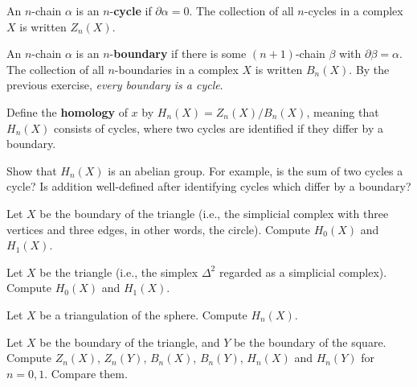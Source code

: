 \documentclass[12pt]{pset}
\begin{document}
\begin{definition*}
 An $n$-chain $\alpha$ is an $n$-\textbf{cycle} if $\partial \alpha =
 0$.  The collection of all $n$-cycles in a complex $X$ is written $Z_n(X)$.

 An $n$-chain $\alpha$ is an $n$-\textbf{boundary} if there is some
 $(n+1)$-chain $\beta$ with $\partial \beta = \alpha$.  The collection
 of all $n$-boundaries in a complex $X$ is written $B_n(X)$.  By the
 previous exercise, \textit{every boundary is a cycle}.
 
 Define the \textbf{homology} of $x$ by $H_n(X) = Z_n(X)/B_n(X)$,
 meaning that $H_n(X)$ consists of cycles, where two cycles are
 identified if they differ by a boundary.
\end{definition*}

\begin{requiredproblem}
  Show that $H_n(X)$ is an abelian group.  For example, is the sum of
  two cycles a cycle?  Is addition well-defined after identifying
  cycles which differ by a boundary?
\end{requiredproblem}

\begin{requiredproblem}
Let $X$ be the boundary of the triangle (i.e., the simplicial
complex with three vertices and three edges, in other words, the
circle).  Compute $H_0(X)$ and $H_1(X)$.
\end{requiredproblem}

\begin{requiredproblem}
 Let $X$ be the triangle (i.e., the simplex $\Delta^2$ regarded as a
 simplicial complex).  Compute $H_0(X)$ and $H_1(X)$.
\end{requiredproblem}

\begin{requiredproblem}
 Let $X$ be a triangulation of the sphere.  Compute $H_n(X)$.
\end{requiredproblem}

\begin{problem}
Let $X$ be the boundary of the triangle, and $Y$ be the boundary of
the square.  Compute $Z_n(X)$, $Z_n(Y)$, $B_n(X)$, $B_n(Y)$, $H_n(X)$
and $H_n(Y)$ for $n = 0, 1$.  Compare them.
\end{problem}
\end{document}

